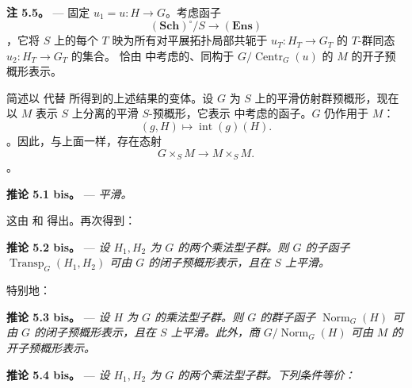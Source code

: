 \medskip\noindent{}\textbf{注 5.5。} --- 固定 \(u_1=u:H\to G\)。考虑函子  \[
  (\mathbf{Sch})^\circ/S\longrightarrow(\mathbf{Ens})
\]，它将 \(S\) 上的每个 \(T\) 映为所有对平展拓扑局部共轭于 \(u_T:H_T\to G_T\) 的 \(T\)-群同态 \(u_2:H_T\to G_T\) 的集合。 恰由  中考虑的、同构于 \(G/\operatorname{Centr}_G(u)\) 的 \(M\) 的开子预概形表示。

简述以  代替  所得到的上述结果的变体。设 \(G\) 为 \(S\) 上的平滑仿射群预概形，现在以 \(M\) 表示 \(S\) 上分离的平滑 \(S\)-预概形，它表示  中考虑的函子。\(G\) 仍作用于 \(M\)： \[
  (g,H)\longmapsto\operatorname{int}(g)(H).
\]。因此，与上面一样，存在态射  \[
  \tag{x bis}
  G\times_S M\longrightarrow M\times_S M.
\]。

\medskip\noindent{}\textbf{推论 5.1 bis。} --- \textit{ 平滑。}

这由  和  得出。再次得到：

\medskip\noindent{}\textbf{推论 5.2 bis。} --- \textit{设 \(H_1,H_2\) 为 \(G\) 的两个乘法型子群。则 \(G\) 的子函子 \(\operatorname{Transp}_G(H_1,H_2)\) 可由 \(G\) 的闭子预概形表示，且在 \(S\) 上平滑。}

特别地：

\medskip\noindent{}\textbf{推论 5.3 bis。} --- \textit{设 \(H\) 为 \(G\) 的乘法型子群。则 \(G\) 的群子函子 \(\operatorname{Norm}_G(H)\) 可由 \(G\) 的闭子预概形表示，且在 \(S\) 上平滑。此外，商 \(G/\operatorname{Norm}_G(H)\) 可由 \(M\) 的开子预概形表示。}

\medskip\noindent{}\textbf{推论 5.4 bis。} --- \textit{设 \(H_1,H_2\) 为 \(G\) 的两个乘法型子群。下列条件等价：}

